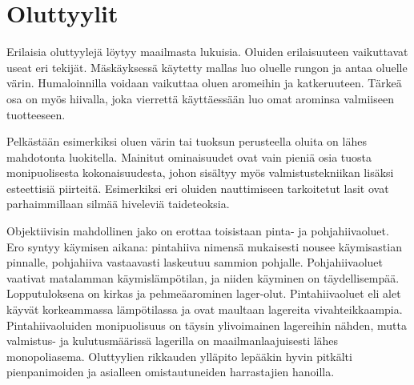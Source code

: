 \documentclass[a4paper,11pt]{report}
\begin{document}
\chapter{Oluttyylit}


Erilaisia oluttyylejä löytyy maailmasta lukuisia. Oluiden erilaisuuteen vaikuttavat useat eri tekijät. Mäskäyksessä käytetty mallas luo oluelle rungon ja antaa oluelle värin. Humaloinnilla voidaan vaikuttaa oluen aromeihin ja katkeruuteen. Tärkeä osa on myös hiivalla, joka vierrettä käyttäessään luo omat arominsa valmiiseen tuotteeseen.

Pelkästään esimerkiksi oluen värin tai tuoksun perusteella oluita on lähes mahdotonta luokitella. Mainitut ominaisuudet ovat vain pieniä osia tuosta monipuolisesta kokonaisuudesta, johon sisältyy myös valmistustekniikan lisäksi esteettisiä piirteitä. Esimerkiksi eri oluiden nauttimiseen tarkoitetut lasit ovat parhaimmillaan silmää hiveleviä taideteoksia.

Objektiivisin mahdollinen jako on erottaa toisistaan pinta- ja pohjahiivaoluet. Ero syntyy käymisen aikana: pintahiiva nimensä mukaisesti nousee käymisastian pinnalle, pohjahiiva vastaavasti laskeutuu sammion pohjalle. Pohjahiivaoluet vaativat matalamman käymislämpötilan, ja niiden käyminen on täydellisempää. Lopputuloksena on kirkas ja pehmeäarominen lager-olut. Pintahiivaoluet eli alet käyvät korkeammassa lämpötilassa ja ovat maultaan lagereita vivahteikkaampia. Pintahiivaoluiden monipuolisuus on täysin ylivoimainen lagereihin nähden, mutta valmistus- ja kulutusmäärissä lagerilla on maailmanlaajuisesti lähes monopoliasema. Oluttyylien rikkauden ylläpito lepääkin hyvin pitkälti pienpanimoiden ja asialleen omistautuneiden harrastajien hanoilla.
\end{document}
